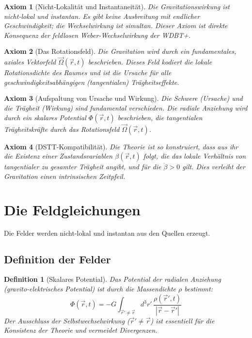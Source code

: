 \documentclass[12pt,a4paper]{article}
\newtheorem{axiom}{Axiom}
\newtheorem{definition}{Definition}
\begin{document}
\begin{axiom}[Nicht-Lokalität und Instantaneität]
Die Gravitationswirkung ist nicht-lokal und instantan. Es gibt keine Ausbreitung mit endlicher Geschwindigkeit; die Wechselwirkung ist simultan. Dieser Axiom ist direkte Konsequenz der feldlosen Weber-Wechselwirkung der WDBT+.
\end{axiom}

\begin{axiom}[Das Rotationsfeld]
Die Gravitation wird durch ein fundamentales, axiales Vektorfeld $\vec{\Omega}(\vec{r}, t)$ beschrieben. Dieses Feld kodiert die lokale Rotationsdichte des Raumes und ist die Ursache für alle geschwindigkeitsabhängigen (tangentialen) Trägheitseffekte.
\end{axiom}

\begin{axiom}[Aufspaltung von Ursache und Wirkung]
Die Schwere (Ursache) und die Trägheit (Wirkung) sind fundamental verschieden. Die radiale Anziehung wird durch ein skalares Potential $\Phi(\vec{r}, t)$ beschrieben, die tangentialen Trägheitskräfte durch das Rotationsfeld $\vec{\Omega}(\vec{r}, t)$.
\end{axiom}

\begin{axiom}[DSTT-Kompatibilität]
Die Theorie ist so konstruiert, dass aus ihr die Existenz einer Zustandsvariablen $\beta(\vec{r}, t)$ folgt, die das lokale Verhältnis von tangentialer zu gesamter Trägheit angibt, und für die $\dot{\beta} > 0$ gilt. Dies verleiht der Gravitation einen intrinsischen Zeitpfeil.
\end{axiom}

\section{Die Feldgleichungen}

Die Felder werden nicht-lokal und instantan aus den Quellen erzeugt.

\subsection{Definition der Felder}

\begin{definition}[Skalares Potential]
Das Potential der radialen Anziehung (gravito-elektrisches Potential) ist durch die Massendichte $\rho$ bestimmt:
\begin{equation}
\boxed{ \Phi(\vec{r}, t) = -G \int_{\vec{r}' \neq \vec{r}} d^3r' \, \frac{\rho(\vec{r}', t)}{|\vec{r} - \vec{r}'|} }
\end{equation}
Der Ausschluss der Selbstwechselwirkung ($\vec{r}' \neq \vec{r}$) ist essentiell für die Konsistenz der Theorie und vermeidet Divergenzen.
\end{definition}
\end{document}
